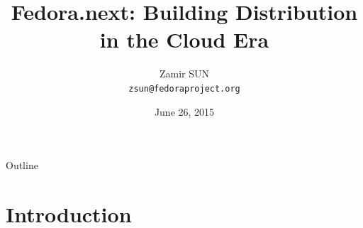 \documentclass{beamer}
\title[Building Distribution in the Cloud Era]{Fedora.next: Building Distribution in the Cloud Era}
\author[Zamir] %
{Zamir SUN\\ \texttt{zsun@fedoraproject.org}}
\date[HKOSCon 2015] %
{June 26, 2015}
\begin{document}
\begin{frame}
  \titlepage
\end{frame}

\begin{frame}{Outline}
  \tableofcontents
\end{frame}




\section{Introduction}


\end{document}
